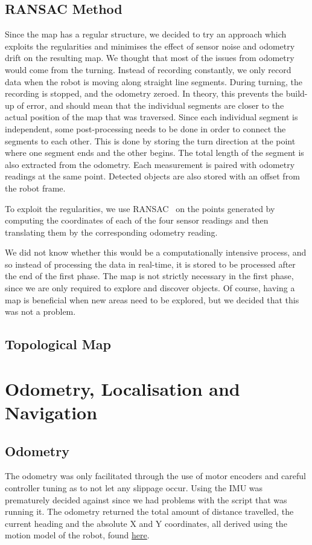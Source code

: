 \subsection{RANSAC Method}
Since the map has a regular structure, we decided to try an approach which
exploits the regularities and minimises the effect of sensor noise and odometry
drift on the resulting map. We thought that most of the issues from odometry
would come from the turning. Instead of recording constantly, we only record
data when the robot is moving along straight line segments. During turning, the
recording is stopped, and the odometry zeroed. In theory, this prevents the
build-up of error, and should mean that the individual segments are closer to
the actual position of the map that was traversed. Since each individual segment
is independent, some post-processing needs to be done in order to connect the
segments to each other. This is done by storing the turn direction at the point
where one segment ends and the other begins. The total length of the segment is
also extracted from the odometry. Each measurement is paired with odometry
readings at the same point. Detected objects are also stored with an offset from
the robot frame.

To exploit the regularities, we use RANSAC~\cite{fischler1981random} on the
points generated by computing the coordinates of each of the four sensor
readings and then translating them by the corresponding odometry reading. 

We did not know whether this would be a computationally intensive process, and
so instead of processing the data in real-time, it is stored to be processed
after the end of the first phase. The map is not strictly necessary in the first
phase, since we are only required to explore and discover objects. Of course,
having a map is beneficial when new areas need to be explored, but we decided
that this was not a problem.

\subsection{Topological Map}
\section{Odometry, Localisation and Navigation}
\subsection{Odometry}
The odometry was only facilitated through the use of motor encoders and careful controller tuning as to not let any slippage occur. Using the IMU was prematurely decided against since we had problems with the script that was running it. 
The odometry returned the total amount of distance travelled, the current heading and the absolute X and Y coordinates, all derived using the motion model of the robot, found \href{http://goo.gl/SGA99c}{here}.
